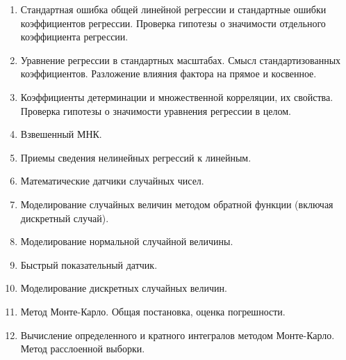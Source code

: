 \documentclass[12pt]{article}
\begin{document}
\begin{enumerate}
    \item Стандартная ошибка общей линейной регрессии и стандартные ошибки коэффициентов регрессии. Проверка гипотезы о значимости отдельного коэффициента регрессии.
    \item Уравнение регрессии в стандартных масштабах. Смысл стандартизованных коэффициентов. Разложение влияния фактора на прямое и косвенное.
    \item Коэффициенты детерминации и множественной корреляции, их свойства. Проверка гипотезы о значимости уравнения регрессии в целом.
    \item Взвешенный МНК.
    \item Приемы сведения нелинейных регрессий к линейным.
    \item Математические датчики случайных чисел.
    \item Моделирование случайных величин методом обратной функции (включая дискретный случай).
    \item Моделирование нормальной случайной величины.
    \item Быстрый показательный датчик.
    \item Моделирование дискретных случайных величин.
    \item Метод Монте-Карло. Общая постановка, оценка погрешности.
    \item Вычисление определенного и кратного интегралов методом Монте-Карло. Метод расслоенной выборки.
\end{enumerate}

\end{document}
